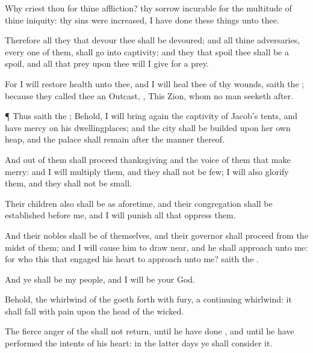 {Why
criest thou for thine
affliction? thy
sorrow
{}
incurable for the
multitude of thine
iniquity:
{} thy
sins were
increased, I have
done these things unto thee.

Therefore all they that
devour thee shall be
devoured; and all thine
adversaries, every one of them, shall
go into
captivity; and they that
spoil thee shall be a
spoil, and all that
prey upon thee will I
give for a
prey.

For I will
restore
health unto thee, and I will
heal thee of thy
wounds,
saith the
{}; because they
called thee an
Outcast,
{}, This
{}
Zion, whom no man seeketh
after.


\par }{\PP {}¶ Thus
saith the
{}; Behold, I will bring
again the
captivity of
Jacob’s
tents, and have
mercy on his
dwellingplaces; and the
city shall be
builded upon her own
heap, and the
palace shall
remain after the
manner thereof.

And out of them shall
proceed
thanksgiving and the
voice of them that make
merry: and I will
multiply them, and they shall not be
few; I will also
glorify them, and they shall not be
small.

Their
children also shall be as
aforetime, and their
congregation shall be
established
before me, and I will
punish all that
oppress them.

And their
nobles shall be of themselves, and their
governor shall
proceed from the
midst of them; and I will cause him to draw
near, and he shall
approach unto me: for who
{} this that
engaged his
heart to
approach unto me?
saith the
{}.

And ye shall be my
people, and I will be your
God.

Behold, the
whirlwind of the
{} goeth
forth with
fury, a
continuing
whirlwind: it shall fall with
pain upon the
head of the
wicked.

The
fierce
anger of the
{} shall not
return, until he have
done
{}, and until he have
performed the
intents of his
heart: in the
latter
days ye shall
consider it.




\par }
